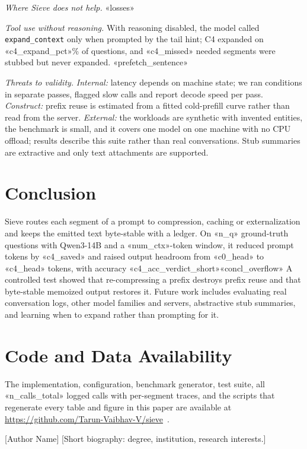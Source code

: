 \documentclass[journal]{IEEEtran}
\begin{document}
\textit{Where Sieve does not help.} «losses»

\textit{Tool use without reasoning.} With reasoning disabled, the model called \texttt{expand\_context} only when prompted by the
tail hint; C4 expanded on «c4_expand_pct»\% of questions, and «c4_missed» needed segments were stubbed but never expanded. «prefetch_sentence»

\textit{Threats to validity.} \emph{Internal:} latency depends on machine state; we ran conditions in separate passes, flagged slow
calls and report decode speed per pass. \emph{Construct:} prefix reuse is estimated from a fitted cold-prefill curve rather than read
from the server. \emph{External:} the workloads are synthetic with invented entities, the benchmark is small, and it covers one model
on one machine with no CPU offload; results describe this suite rather than real conversations. Stub summaries are extractive and
only text attachments are supported.

\section{Conclusion}\label{sec:conclusion}
Sieve routes each segment of a prompt to compression, caching or externalization and keeps the emitted text byte-stable with a
ledger. On «n_q» ground-truth questions with Qwen3-14B and a «num_ctx»-token window, it reduced prompt tokens by «c4_saved»
and raised output headroom from «c0_head» to «c4_head» tokens, with accuracy «c4_acc_verdict_short»«concl_overflow» A controlled test showed that re-compressing a
prefix destroys prefix reuse and that byte-stable memoized output restores it. Future work includes evaluating real conversation
logs, other model families and servers, abstractive stub summaries, and learning when to expand rather than prompting for it.

\section*{Code and Data Availability}
The implementation, configuration, benchmark generator, test suite, all «n_calls_total» logged calls with per-segment traces, and the
scripts that regenerate every table and figure in this paper are available at \url{https://github.com/Tarun-Vaibhav-V/sieve}~\cite{sieve2026code}.




\begin{IEEEbiographynophoto}{[Author Name]}
[Short biography: degree, institution, research interests.]
\end{IEEEbiographynophoto}
\end{document}
